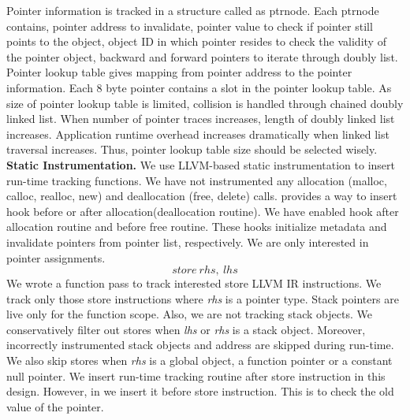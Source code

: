 Pointer information is tracked in a structure called as ptrnode. Each ptrnode contains, pointer address to invalidate, pointer value to check if pointer still points to the object, object ID in which pointer resides to check the validity of the pointer object, backward and forward pointers to iterate through doubly list.
Pointer lookup table gives mapping from pointer address to the pointer information. Each $8$ byte pointer contains a slot in the pointer lookup table. As size of pointer lookup table is limited, collision is handled through chained doubly linked list. When number of pointer traces increases, length of doubly linked list increases. Application runtime overhead increases dramatically when linked list traversal increases. Thus, pointer lookup table size should be selected wisely. \\

\textbf{Static Instrumentation.} We use LLVM-based static instrumentation to insert run-time tracking functions. We have not instrumented any allocation (malloc, calloc, realloc, new) and deallocation (free, delete) calls. \metalloc{} provides a way to insert hook before or after allocation(deallocation routine). We have enabled hook after allocation routine and before free routine. These hooks initialize metadata and invalidate pointers from pointer list, respectively. We are only interested in pointer assignments. 
$$ store\ rhs,\ lhs $$
We wrote a function pass to track interested store LLVM IR instructions. We track only those store instructions where \textit{rhs} is a pointer type. Stack pointers are live only for the function scope. Also, we are not tracking stack objects. We conservatively filter out stores when \textit{lhs} or \textit{rhs} is a stack object. Moreover, incorrectly instrumented stack objects and address are skipped during run-time. We also skip stores when \textit{rhs} is a global object, a function pointer or a constant null pointer. We insert run-time tracking routine after store instruction in this design. However, in \projectname{} we insert it before store instruction. This is to check the old value of the pointer. \\

